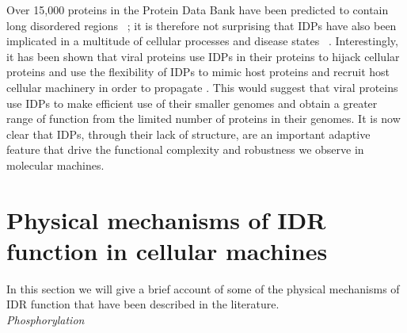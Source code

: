 Over 15,000 proteins in the Protein Data Bank have been predicted to contain long disordered regions ~\cite{romero1998thousands}; it is therefore not surprising that  IDPs have also been implicated  in a multitude of cellular processes and disease states ~\cite{uversky2008intrinsically}.  Interestingly, it has been shown that viral proteins use IDPs in their proteins to hijack cellular proteins and use the flexibility of IDPs to mimic host proteins and recruit host cellular machinery in order to propagate \cite{davey2011viruses}. This would suggest that viral proteins use IDPs to make efficient use of their smaller genomes and obtain a greater range of function from the limited number of proteins in their genomes. It is now clear that IDPs, through their lack of structure, are an important adaptive feature that drive the functional complexity and robustness we observe in molecular machines. \\

\section{Physical mechanisms of IDR function in cellular machines}

In this section we will give a brief account of some of the physical mechanisms of IDR function that have been described in the literature. \\

{\it Phosphorylation}

